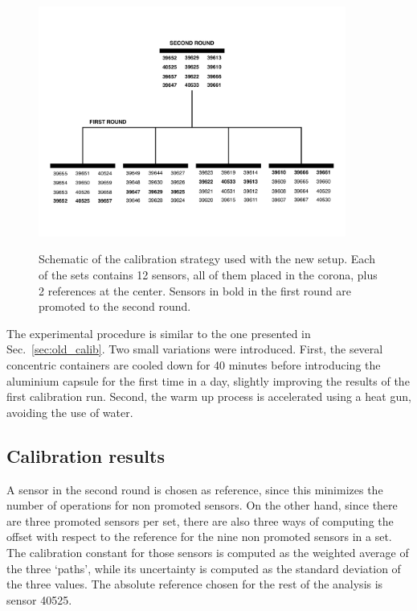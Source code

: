 \label{sec:newCalibrationStrategy}
\begin{figure}[htbp]
\centering
{\includegraphics[width=0.9\textwidth]{images/figure_18.pdf}}
\caption{Schematic of the calibration strategy used with the new setup. Each of the sets contains 12 sensors, all of them placed in the corona, plus 2 references at the center. Sensors in bold in the first round are promoted to the second round.}
\label{fig:newCalibrationStrategy}
\end{figure}

The experimental procedure is similar to the one presented in Sec.~\ref{sec:old_calib}. Two small variations were introduced. First, the several concentric containers are cooled down for 40 minutes before introducing the aluminium capsule for the first time in a day, slightly improving the results of the first calibration run. Second, the warm up process is accelerated using a heat gun, avoiding the use of water.

\subsection{Calibration results}
\label{sec:new_calib_results}

\noindent A sensor in the second round is chosen as reference, since this minimizes the number of operations for non promoted sensors. On the other hand, since there are three promoted sensors per set, there are also three ways of computing the offset with respect to the reference for the nine non promoted sensors in a set. The calibration constant for those sensors is computed as the weighted average of the three `paths', while its uncertainty is computed as the standard deviation of the three values. The absolute reference chosen for the rest of the analysis is sensor 40525.

